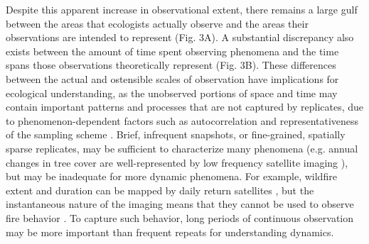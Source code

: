 \documentclass[12pt]{article}
\begin{document}
Despite this apparent increase in observational extent, there remains a large gulf between the areas that ecologists actually observe and the areas their observations are intended to represent (Fig. 3A). A substantial discrepancy also exists between the amount of time spent observing phenomena and the time spans those observations theoretically represent (Fig. 3B). These differences between the actual and ostensible scales of observation have implications for ecological understanding, as the unobserved portions of space and time may contain important patterns and processes that are not captured by replicates, due to phenomenon-dependent factors such as autocorrelation and representativeness of the sampling scheme \cite{underwood_experiments_1997,palmer_scale_1994, cao_comparison_2002, legendre_spatial_1993,collins_method_2000}. Brief, infrequent snapshots, or fine-grained, spatially sparse replicates, may be sufficient to characterize many phenomena (e.g. annual changes in tree cover are well-represented by low frequency satellite imaging \cite{hansen_high-resolution_2013}), but may be inadequate for more dynamic phenomena. For example, wildfire extent and duration can be mapped by daily return satellites \cite{roy_prototyping_2005,jones_fire_2009}, but the instantaneous nature of the imaging means that they cannot be used to observe fire behavior \cite{clements_observing_2007}. To capture such behavior, long periods of continuous observation may be more important  than frequent repeats for understanding dynamics. 
\end{document}
